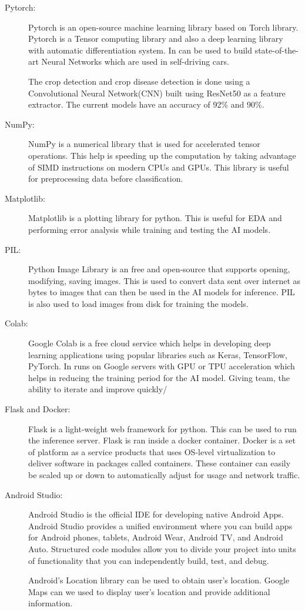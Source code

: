 \documentclass[../Report.tex]{subfiles}
\begin{document}
\begin{description}
  \item[Pytorch: ] Pytorch is an open-source machine learning library based on Torch library. Pytorch is a Tensor computing library and also 
  a deep learning library with automatic differentiation system. In can be used to build state-of-the-art Neural Networks which are used in
  self-driving cars.\par
  The crop detection and crop disease detection is done using a Convolutional Neural Network(CNN) built using ResNet50 as a feature extractor.
  The current models have an accuracy of 92\% and 90\%.

  \item[NumPy: ] NumPy is a numerical library that is used for accelerated tensor operations. This help is speeding up the computation by 
  taking advantage of SIMD instructions on modern CPUs and GPUs. This library is useful for preprocessing data before classification.

  \item[Matplotlib: ] Matplotlib is a plotting library for python. This is useful for EDA and performing error analysis while training 
  and testing the AI models.

  \item[PIL: ] Python Image Library is an free and open-source that supports opening, modifying, saving images. This is used to convert data
  sent over internet as bytes to images that can then be used in the AI models for inference. PIL is also used to load images from disk for
  training the models.

  \item[Colab: ] Google Colab is a free cloud service which helps in developing deep learning applications using popular libraries such 
  as Keras, TensorFlow, PyTorch. In runs on Google servers with GPU or TPU acceleration which helps in reducing the training period for 
  the AI model. Giving team, the ability to iterate and improve quickly/

  \item[Flask and Docker: ] Flask is a light-weight web framework for python. This can be used to run the inference server. Flask is ran
  inside a docker container. Docker is a set of platform as a service products that uses OS-level virtualization to deliver software in 
  packages called containers. These container can easily be scaled up or down to automatically adjust for usage and network traffic.

  \item[Android Studio: ] Android Studio is the official IDE for developing native Android Apps. Android Studio provides a unified  
  environment where you can build apps for Android phones, tablets, Android Wear, Android TV, and Android Auto. Structured code modules 
  allow you to  divide your project into units of functionality that you can independently build, test, and debug.\par
  Android's Location library can be used to obtain user's location. Google Maps can we used to display user's location and provide 
  additional information.


\end{description}
\end{document}
